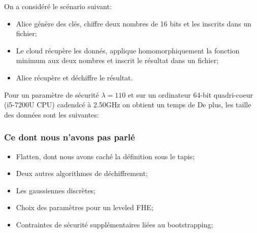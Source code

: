 \documentclass[10pt,xcolor={usenames,dvipsnames}]{beamer}
\begin{document}
\begin{frame} 
On a considéré le scénario suivant:
\begin{itemize}
\item Alice génère des clés, chiffre deux nombres de 16 bits  et les inscrits dans un fichier;
\item Le cloud récupère les donnés, applique homomorphiquement la fonction minimum aux deux nombres et inscrit le résultat dans un fichier;
\item Alice récupère et déchiffre le résultat.
\end{itemize}
Pour un paramètre de sécurité $\lambda = 110$ et sur un ordinateur 64-bit quadri-coeur (i5-7200U CPU) cadendcé à 2.50GHz
on obtient un temps de 
De plus, les taille des données sont les suivantes:

\end{frame} 


\begin{frame}
\frametitle{Ce dont nous n'avons pas parlé}
\begin{itemize}
\item Flatten, dont nous avons caché la définition sous le tapis;
\item Deux autres algorithmes de déchiffrement;
\item Les gaussiennes discrètes;
\item Choix des paramètres pour un leveled FHE;
\item Contraintes de sécurité supplémentaires liées au bootstrapping;
\end{itemize}
\end{frame}

\end{document}
